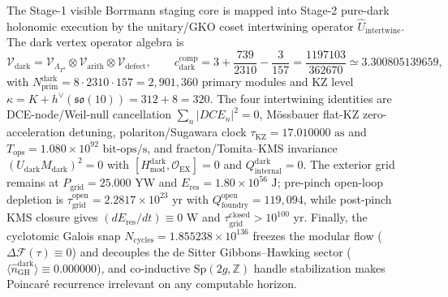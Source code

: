 \documentclass[11pt,onecolumn]{article}
\begin{document}
The Stage-1 visible Borrmann staging core is mapped into Stage-2 pure-dark holonomic execution by the unitary/GKO coset intertwining operator $\widehat U_{\text{intertwine}}$. The dark vertex operator algebra is
\begin{equation}
\mathcal{V}_{\text{dark}}=\mathcal{V}_{\Lambda_{T^3}}\otimes\mathcal{V}_{\text{arith}}\otimes\mathcal{V}_{\text{defect}},
\qquad
c_{\text{dark}}^{\text{comp}}=3+\frac{739}{2310}-\frac{3}{157}=\frac{1197103}{362670}\simeq3.300805139659,
\label{eq:dark_voa}
\end{equation}
with $N_{\text{prim}}^{\text{dark}}=8\cdot2310\cdot157=2{,}901{,}360$ primary modules and KZ level $\kappa=K+h^\vee(\mathfrak{so}(10))=312+8=320$. The four intertwining identities are DCE-node/Weil-null cancellation $\sum_n|DCE_n|^2=0$, M\"ossbauer flat-KZ zero-acceleration detuning, polariton/Sugawara clock $\tau_{\text{KZ}}=17.010000\text{ as}$ and $T_{\text{ops}}=1.080\times10^{92}\text{ bit-ops/s}$, and fracton/Tomita--KMS invariance $(U_{\text{dark}}M_{\text{dark}})^2=0$ with $[H_{\text{mod}}^{\text{dark}},\mathcal{O}_{\text{EX}}]=0$ and $Q_{\text{internal}}^{\text{dark}}=0$. The exterior grid remains at $P_{\text{grid}}=25.000\text{ YW}$ and $E_{\text{res}}=1.80\times10^{56}\text{ J}$; pre-pinch open-loop depletion is $\tau_{\text{grid}}^{\text{open}}=2.2817\times10^{23}\text{ yr}$ with $Q_{\text{foundry}}^{\text{open}}=119{,}094$, while post-pinch KMS closure gives $(dE_{\text{res}}/dt)\equiv0\text{ W}$ and $\tau_{\text{grid}}^{\text{closed}}>10^{100}\text{ yr}$. Finally, the cyclotomic Galois snap $N_{\text{cycles}}=1.855238\times10^{136}$ freezes the modular flow ($\Delta\mathcal{F}(\tau)\equiv0$) and decouples the de Sitter Gibbons--Hawking sector ($\langle\hat n_{\text{GH}}^{\text{dark}}\rangle\equiv0.000000$), and co-inductive $\mathrm{Sp}(2g,\mathbb{Z})$ handle stabilization makes Poincar\'e recurrence irrelevant on any computable horizon.
\end{document}
